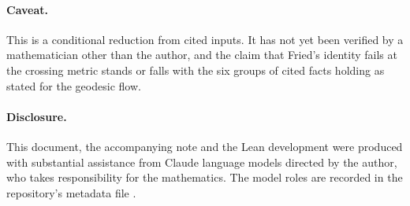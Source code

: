\documentclass[11pt]{article}
\begin{document}
\paragraph{Caveat.} This is a conditional reduction from cited inputs. It has not yet been
verified by a mathematician other than the author, and the claim that Fried's identity fails at
the crossing metric stands or falls with the six groups of cited facts holding as stated for the
geodesic flow.

\paragraph{Disclosure.} This document, the accompanying note and the Lean development were
produced with substantial assistance from Claude language models directed by the author, who
takes responsibility for the mathematics. The model roles are recorded in the repository's
metadata file .
\end{document}
